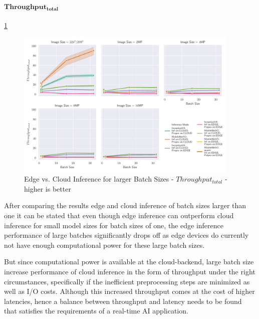 \paragraph{$\mathbf{Throughput_{total}}$}
\ref{fig:BatchSizeTotalThroughput}
\begin{figure}[!htb]
\centering
\includegraphics[width=0.95\textwidth]{./Bilder/single_plots/batch_size_plots/Effects_of_Batch_size_Total_Throughput_(Preprocessing_+_Inference).pdf}
\caption{Edge vs. Cloud Inference for larger Batch Sizes -  $Throughput_{total}$ - higher is better}
\label{fig:BatchSizeTotalThroughput}
\end{figure}


\FloatBarrier

After comparing the results edge and cloud inference of batch sizes larger than one it can be stated that even though edge inference can outperform cloud inference for small model sizes for batch sizes of one, the edge inference performance of large batches significantly drops off as edge devices do currently not have enough computational power for these large batch sizes.

But since computational power is available at the cloud-backend, large batch size increase performance of cloud inference in the form of throughput under the right circumstances, specifically if the inefficient preprocessing steps are minimized as well as I/O costs.
Although this increased throughput comes at the cost of higher latencies, hence a balance between throughput and latency needs to be found that satisfies the requirements of a real-time AI application.

